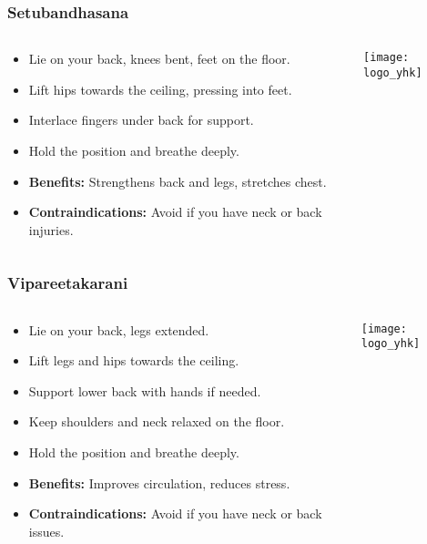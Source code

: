 \begin{frame}[fragile]\frametitle{Setubandhasana}
\begin{columns}
    \begin{column}[T]{0.5\linewidth}
      \begin{itemize}
        \item Lie on your back, knees bent, feet on the floor.
        \item Lift hips towards the ceiling, pressing into feet.
        \item Interlace fingers under back for support.
        \item Hold the position and breathe deeply.
        \item \textbf{Benefits:} Strengthens back and legs, stretches chest.
        \item \textbf{Contraindications:} Avoid if you have neck or back injuries.
      \end{itemize}
    \end{column}
    \begin{column}[T]{0.5\linewidth}
        \begin{center}
        \texttt{[image: logo\_yhk]}
        \end{center}    
    \end{column}
  \end{columns}
\end{frame}

\begin{frame}[fragile]\frametitle{Vipareetakarani}
\begin{columns}
    \begin{column}[T]{0.5\linewidth}
      \begin{itemize}
        \item Lie on your back, legs extended.
        \item Lift legs and hips towards the ceiling.
        \item Support lower back with hands if needed.
        \item Keep shoulders and neck relaxed on the floor.
        \item Hold the position and breathe deeply.
        \item \textbf{Benefits:} Improves circulation, reduces stress.
        \item \textbf{Contraindications:} Avoid if you have neck or back issues.
      \end{itemize}
    \end{column}
    \begin{column}[T]{0.5\linewidth}
        \begin{center}
        \texttt{[image: logo\_yhk]}
        \end{center}    
    \end{column}
  \end{columns}
\end{frame}

